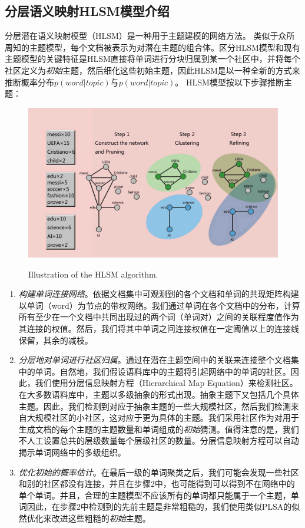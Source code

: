 \subsection{分层语义映射HLSM模型介绍}
分层潜在语义映射模型（HLSM）是一种用于主题建模的网络方法。 类似于众所周知的主题模型，每个文档被表示为对潜在主题的组合体。区分HLSM模型和现有主题模型的关键特征是HLSM直接将单词进行分块归属到某一个社区中，并将每个社区定义为\emph{初始}主题，然后细化这些初始主题，因此HLSM是以一种全新的方式来推断概率分布$p(word|topic)$与$p(word|topic)$。
HLSM模型按以下步骤推断主题：
   \begin{figure}[!h]
\centering
  \includegraphics[width=1.0\linewidth]{./graph/hlsmJPG.jpg}\\
  \caption{Illustration of the HLSM algorithm.}\label{fig:hlsm}
\end{figure}
\begin{enumerate}[步骤 1.]
\item \emph{构建单词连接网络}。依据文档集中可观测到的各个文档和单词的共现矩阵构建以单词（word）为节点的带权网络。我们通过单词在各个文档中的分布，计算所有至少在一个文档中共同出现过的两个词（单词对）之间的关联程度值作为其连接的权值。然后，我们将其中单词之间连接权值在一定阈值以上的连接线保留，其余的减枝。
\item \emph{分层地对单词进行社区归属}。通过在潜在主题空间中的关联来连接整个文档集中的单词。自然地，我们假设语料库中的主题将引起网络中的单词的社区。因此，我们使用分层信息映射方程（Hierarchical Map Equation）\cite{HME}来检测社区。在大多数语料库中，主题以多级抽象的形式出现。抽象主题下又包括几个具体主题。因此，我们检测到对应于抽象主题的一些大规模社区，然后我们检测来自大规模社区的小社区，这对应于更为具体的主题。我们采用社区作为对用于生成文档的每个主题的主题数量和单词组成的\emph{初始}猜测。值得注意的是，我们不人工设置总共的层级数量每个层级社区的数量。分层信息映射方程可以自动揭示单词网络中的多级组织。
\item \emph{优化初始的概率估计}。在最后一级的单词聚类之后，我们可能会发现一些社区和别的社区都没有连接，并且在步骤2中，也可能得到可以得到不在网络中的单个单词。并且，合理的主题模型不应该所有的单词都只能属于一个主题，单词因此，在步骤2中检测到的先前主题是非常粗糙的，我们使用类似PLSA的似然优化来改进这些粗糙的\emph{初始}主题。
\end{enumerate}

